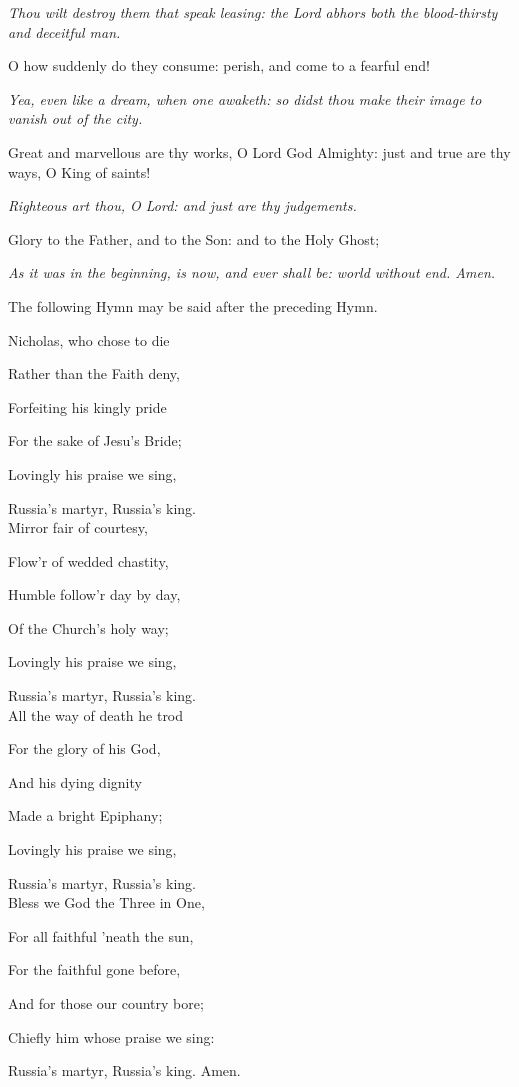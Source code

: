 \textit{Thou wilt destroy them that speak leasing: the Lord abhors both the blood-thirsty and deceitful man.}

O how suddenly do they consume: perish, and come to a fearful end!

\textit{Yea, even like a dream, when one awaketh: so didst thou make their image to vanish out of the city.}

Great and marvellous are thy works, O Lord God Almighty: just and true are thy ways, O King of saints!

\textit{Righteous art thou, O Lord: and just are thy judgements.}

Glory to the Father, and to the Son: and to the Holy Ghost;

\textit{As it was in the beginning, is now, and ever shall be: world without end. Amen.}

\begin{rubric}
	The following Hymn may be said after the preceding Hymn.
\end{rubric}
\begin{multicols}{2}
Nicholas, who chose to die

Rather than the Faith deny,

Forfeiting his kingly pride

For the sake of Jesu's Bride;

Lovingly his praise we sing,

Russia's martyr, Russia's king.\\

Mirror fair of courtesy,

Flow'r of wedded chastity,

Humble follow'r day by day,

Of the Church's holy way;

Lovingly his praise we sing,

Russia's martyr, Russia's king.\\

All the way of death he trod

For the glory of his God,

And his dying dignity

Made a bright Epiphany;

Lovingly his praise we sing,

Russia's martyr, Russia's king.\\

Bless we God the Three in One,

For all faithful 'neath the sun,

For the faithful gone before,

And for those our country bore;

Chiefly him whose praise we sing:

Russia's martyr, Russia's king. Amen.\\
\end{multicols}

